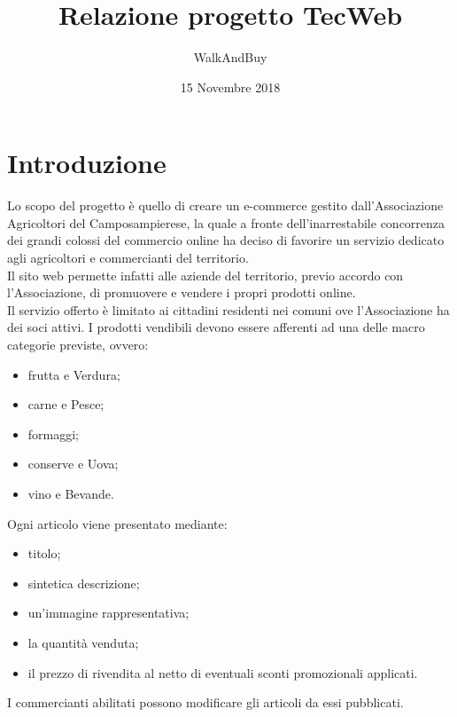 



\title{\textbf{Relazione progetto TecWeb}}
\author{WalkAndBuy}

\date{15 Novembre 2018}




\makeFrontPage

\tableofcontents

\newpage

\section{Introduzione}

Lo scopo del progetto è quello di creare un e-commerce gestito dall’Associazione Agricoltori del Camposampierese, la quale a fronte dell'inarrestabile concorrenza dei grandi colossi del commercio online ha deciso di favorire un servizio dedicato agli agricoltori e commercianti del territorio.\\
Il sito web permette infatti alle aziende del territorio, previo accordo con l’Associazione, di promuovere e vendere i propri prodotti online. \\
Il servizio offerto è limitato ai cittadini residenti nei comuni ove l’Associazione ha dei soci attivi.
I prodotti vendibili devono essere afferenti ad una delle macro categorie previste, ovvero:
\begin{itemize}
	\item frutta e Verdura;
	\item carne e Pesce;
	\item formaggi;
	\item conserve e Uova;
	\item vino e Bevande.
\end{itemize}
Ogni articolo viene presentato mediante:
\begin{itemize}
	\item titolo;
	\item sintetica descrizione;
	\item un’immagine rappresentativa;
	\item la quantità venduta;
	\item il prezzo di rivendita al netto di eventuali sconti promozionali applicati.
\end{itemize}
I commercianti abilitati possono modificare gli articoli da essi pubblicati.\\

